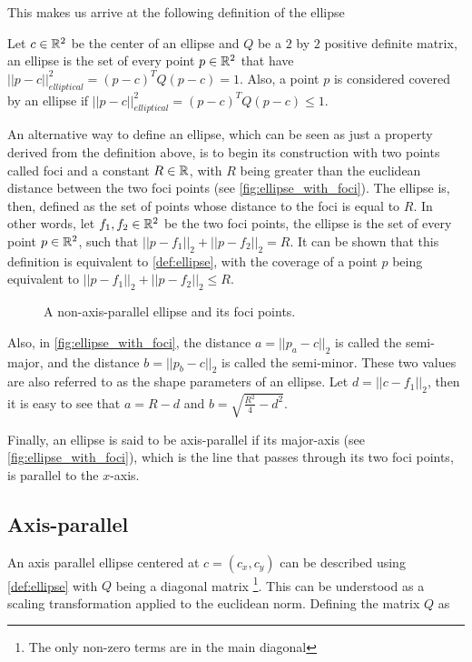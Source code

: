 This makes us arrive at the following definition of the ellipse

\begin{definicao}\label{def:ellipse}
    Let $c\in \mathbb{R}^2$ be the center of an ellipse and $Q$ be a $2$ by $2$ positive definite matrix, an ellipse is the set of every point $p \in \mathbb{R}^2$ that have $||p-c||_{elliptical}^2 = (p-c)^{T}Q(p-c) = 1$. Also, a point $p$ is considered covered by an ellipse if $||p-c||_{elliptical}^2 = (p-c)^{T}Q(p-c) \le 1$.
\end{definicao}

An alternative way to define an ellipse, which can be seen as just a property derived from the definition above, is to begin its construction with two points called foci and a constant $R \in \mathbb{R}$, with $R$ being greater than the euclidean distance between the two foci points (see \autoref{fig:ellipse_with_foci}). The ellipse is, then, defined as the set of points whose distance to the foci is equal to $R$. In other words, let $f_1, f_2 \in \mathbb{R}^2$ be the two foci points, the ellipse is the set of every point $p \in \mathbb{R}^2$, such that $||p-f_1||_2 + ||p-f_2||_2 = R$. It can be shown that this definition is equivalent to \autoref{def:ellipse}, with the coverage of a point $p$ being equivalent to $||p-f_1||_2 + ||p-f_2||_2 \le R$.

\begin{figure}[H]
    \centering
    
    \caption{A non-axis-parallel ellipse and its foci points.}
    
    \fautor
    \label{fig:ellipse_with_foci}
\end{figure}

Also, in \autoref{fig:ellipse_with_foci}, the distance $a = ||p_a - c||_2$ is called the semi-major, and the distance $b = ||p_b-c||_2$ is called the semi-minor. These two values are also referred to as the shape parameters of an ellipse. Let $d = ||c-f_1||_2$, then it is easy to see that $a = R - d$ and $b = \sqrt{\frac{R^2}{4} - d^2}$.

Finally, an ellipse is said to be axis-parallel if its major-axis (see \autoref{fig:ellipse_with_foci}), which is the line that passes through its two foci points, is parallel to the $x$-axis.

\subsection{Axis-parallel}

An axis parallel ellipse centered at $c = (c_x,c_y)$ can be described using \autoref{def:ellipse} with $Q$ being a diagonal matrix \footnote{The only non-zero terms are in the main diagonal}. This can be understood as a scaling transformation applied to the euclidean norm.
Defining the matrix $Q$ as

